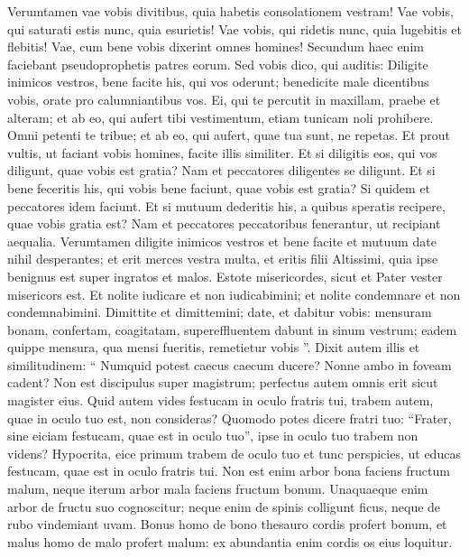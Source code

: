 \begin{biblechapter}
\begin{biblechapter}
\begin{biblechapter}
\begin{biblechapter}
\begin{biblechapter}
\begin{biblechapter}
 \verse Verumtamen vae vobis divitibus, quia habetis consolationem vestram!
 \verse Vae vobis, qui saturati estis nunc, quia esurietis!
 Vae vobis, qui ridetis nunc, quia lugebitis et flebitis!
 \verse Vae, cum bene vobis dixerint omnes homines! Secundum haec enim faciebant pseudoprophetis patres eorum.
 \verse Sed vobis dico, qui auditis: Diligite inimicos vestros, bene facite his, qui vos oderunt; 
\verse benedicite male dicentibus vobis, orate pro calumniantibus vos. 
\verse Ei, qui te percutit in maxillam, praebe et alteram; et ab eo, qui aufert tibi vestimentum, etiam tunicam noli prohibere. 
\verse Omni petenti te tribue; et ab eo, qui aufert, quae tua sunt, ne repetas. 
\verse Et prout vultis, ut faciant vobis homines, facite illis similiter. 
\verse Et si diligitis eos, qui vos diligunt, quae vobis est gratia? Nam et peccatores diligentes se diligunt. 
 \verse Et si bene feceritis his, qui vobis bene faciunt, quae vobis est gratia? Si quidem et peccatores idem faciunt. 
\verse Et si mutuum dederitis his, a quibus speratis recipere, quae vobis gratia est? Nam et peccatores peccatoribus fenerantur, ut recipiant aequalia.
 \verse Verumtamen diligite inimicos vestros et bene facite et mutuum date nihil desperantes; et erit merces vestra multa, et eritis filii Altissimi, quia ipse benignus est super ingratos et malos. 
\verse Estote misericordes, sicut et Pater vester misericors est. 
\verse Et nolite iudicare et non iudicabimini; et nolite condemnare et non condemnabimini. Dimittite et dimittemini; 
\verse date, et dabitur vobis: mensuram bonam, confertam, coagitatam, supereffluentem dabunt in sinum vestrum; eadem quippe mensura, qua mensi fueritis, remetietur vobis ”.
 \verse Dixit autem illis et similitudinem: “ Numquid potest caecus caecum ducere? Nonne ambo in foveam cadent?
 \verse Non est discipulus super magistrum; perfectus autem omnis erit sicut magister eius.
 \verse Quid autem vides festucam in oculo fratris tui, trabem autem, quae in oculo tuo est, non consideras? 
\verse Quomodo potes dicere fratri tuo: “Frater, sine eiciam festucam, quae est in oculo tuo”, ipse in oculo tuo trabem non videns? Hypocrita, eice primum trabem de oculo tuo et tunc perspicies, ut educas festucam, quae est in oculo fratris tui.
 \verse Non est enim arbor bona faciens fructum malum, neque iterum arbor mala faciens fructum bonum. 
\verse Unaquaeque enim arbor de fructu suo cognoscitur; neque enim de spinis colligunt ficus, neque de rubo vindemiant uvam. 
\verse Bonus homo de bono thesauro cordis profert bonum, et malus homo de malo profert malum: ex abundantia enim cordis os eius loquitur.

\end{biblechapter}
\end{biblechapter}
\end{biblechapter}
\end{biblechapter}
\end{biblechapter}
\end{biblechapter}
